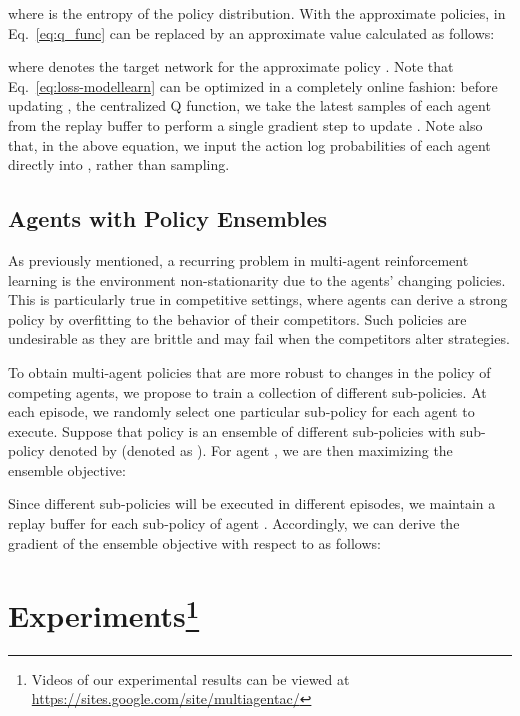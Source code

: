 \documentclass{article}
\begin{document}
where  is the entropy of the policy distribution. With the approximate policies,  in Eq.~\ref{eq:q_func} can be replaced by an approximate value  calculated as follows: 

where  denotes the target network for the approximate policy .
Note that Eq.~\ref{eq:loss-modellearn} can be optimized in a completely online fashion: before updating  , the centralized Q function, we take the latest samples of each agent  from the replay buffer to perform a single gradient step to update . Note also that, in the above equation, we input the action log probabilities of each agent directly into , rather than sampling.

\subsection{Agents with Policy Ensembles}
\label{sec:ensemble}
As previously mentioned, a recurring problem in multi-agent reinforcement learning is the environment non-stationarity due to the agents' changing policies. This is particularly true in competitive settings, where agents can derive a strong policy by overfitting to the behavior of their competitors. Such policies are undesirable as they are brittle and may fail when the competitors alter strategies.



To obtain multi-agent policies that are more robust to changes in the policy of competing agents, we propose to train a collection of  different sub-policies. At each episode, we randomly select one particular sub-policy for each agent to execute. 
Suppose that policy  is an ensemble of  different sub-policies with sub-policy  denoted by  (denoted as ). For agent , we are then maximizing the ensemble objective:



Since different sub-policies will be executed in different episodes, we maintain a replay buffer  for each sub-policy  of agent . Accordingly, we can derive the gradient of the ensemble objective with respect to  as follows:


\section{Experiments\protect\footnote[1]{
Videos of our experimental results can be viewed at \href{https://sites.google.com/site/multiagentac/}{https://sites.google.com/site/multiagentac/}}}
\label{sec:experiments}
\end{document}
